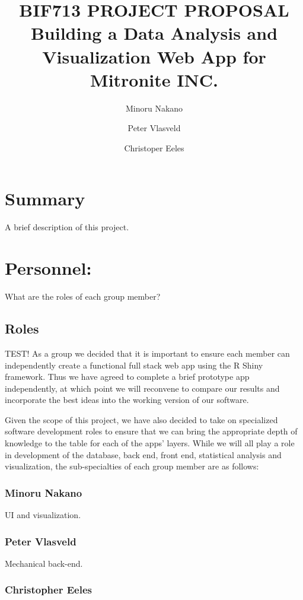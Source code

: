 \documentclass[10pt,twocolumn,letterpaper]{article}
\title{
		\usefont{OT1}{bch}{b}{n}
		\normalfont \normalsize \textsc{BIF713 PROJECT PROPOSAL} \\ [14pt]
		\huge Building a Data Analysis and Visualization Web App for Mitronite INC. \\
}
\author{Minoru Nakano}
\author{Peter Vlasveld}
\author{Christoper Eeles}
\begin{document}
\maketitle


\section*{Summary}
A brief description of this project.

\section{Personnel:}
    	
    	What are the roles of each group member?

            \subsection{Roles}

            TEST! As a group we decided that it is important to ensure each member can independently create a functional full stack web app using the R Shiny framework. Thus we have agreed to complete a brief prototype app independently, at which point we will reconvene to compare our results and incorporate the best ideas into the working version of our software.

            Given the scope of this project, we have also decided to take on specialized software development roles to ensure that we can bring the appropriate depth of knowledge to the table for each of the apps' layers.
            While we will all play a role in development of the database, back end, front end, statistical analysis and visualization, the sub-specialties of each group member are as follows:

                \subsubsection*{Minoru Nakano}

                UI and visualization.

                \subsubsection*{Peter Vlasveld}

                Mechanical back-end.

                \subsubsection*{Christopher Eeles}
\end{document}
